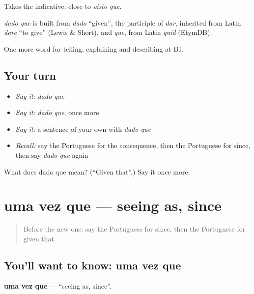 Takes the indicative; close to \emph{visto que}.

\begin{cousinweb}
\emph{dado que} is built from \emph{dado} \textquotedblleft{}given\textquotedblright{}, the participle of \emph{dar}, inherited from Latin \emph{dare} \textquotedblleft{}to give\textquotedblright{} (Lewis \& Short), and \emph{que}, from Latin \emph{quid} (EtymDB).
\end{cousinweb}

\begin{grammarlens}[title={What you've built}]
One more word for telling, explaining and describing at B1.
\end{grammarlens}

\subsection*{Your turn}
\begin{itemize}
\raggedright
  \item \emph{Say it:} \emph{dado que}
  \item \emph{Say it:} \emph{dado que}, once more
  \item \emph{Say it:} a sentence of your own with \emph{dado que}
  \item \emph{Recall:} say the Portuguese for the consequence, then the Portuguese for since, then say \emph{dado que} again
\end{itemize}

\begin{tcolorbox}[breakable,colback=teal!4,colframe=teal!35!black,title={Before you move on}]
What does dado que mean? (\textquotedblleft{}Given that\textquotedblright{}.) Say it once more.
\end{tcolorbox}
\section[uma vez que]{uma vez que — seeing as, since}

\label{lesson:PT-C349-uma-vez-que}



\begin{quote}
Before the new one: say the Portuguese for since, then the Portuguese for given that.
\end{quote}

\subsection*{You'll want to know: uma vez que}
\textbf{uma vez que} — \textquotedblleft{}seeing as, since\textquotedblright{}.

